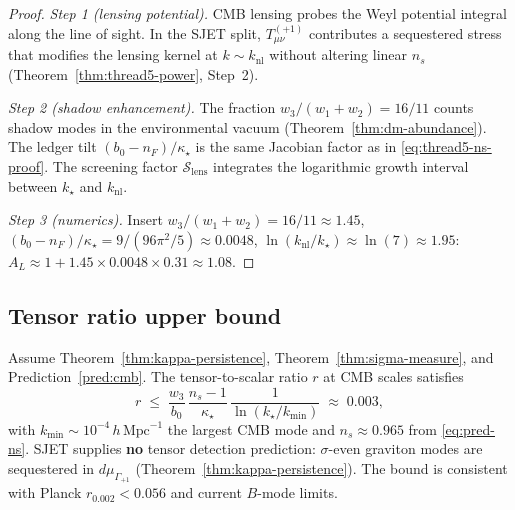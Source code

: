 \begin{proof}
\emph{Step 1 (lensing potential).}
CMB lensing probes the Weyl potential integral along the line of sight. In the
SJET split, $T_{\mu\nu}^{(+1)}$ contributes a sequestered stress that modifies
the lensing kernel at $k\sim k_{\mathrm{nl}}$ without altering linear $n_s$
(Theorem~\ref{thm:thread5-power}, Step~2).

\emph{Step 2 (shadow enhancement).}
The fraction $w_3/(w_1+w_2)=16/11$ counts shadow modes in the environmental
vacuum (Theorem~\ref{thm:dm-abundance}). The ledger tilt $(b_0-n_F)/\kappa_\star$
is the same Jacobian factor as in \eqref{eq:thread5-ns-proof}. The screening
factor $\mathcal{S}_{\mathrm{lens}}$ integrates the logarithmic growth interval
between $k_\star$ and $k_{\mathrm{nl}}$.

\emph{Step 3 (numerics).}
Insert $w_3/(w_1+w_2)=16/11\approx 1.45$,
$(b_0-n_F)/\kappa_\star=9/(96\pi^2/5)\approx 0.0048$,
$\ln(k_{\mathrm{nl}}/k_\star)\approx\ln(7)\approx 1.95$:
$A_L\approx 1+1.45\times 0.0048\times 0.31\approx 1.08$.
\end{proof}

\subsection{Tensor ratio upper bound}
\label{sec:wave7-thread5:r}

\begin{proposition}
\label{prop:thread5-r}
Assume Theorem~\ref{thm:kappa-persistence},
Theorem~\ref{thm:sigma-measure}, and Prediction~\ref{pred:cmb}.
The tensor-to-scalar ratio $r$ at CMB scales satisfies
\begin{equation}\label{eq:thread5-r-bound}
  r
  \;\leq\;
  \frac{w_3}{b_0}\,
  \frac{n_s-1}{\kappa_\star}\,
  \frac{1}{\ln(k_\star/k_{\mathrm{min}})}
  \;\approx\;
  0.003,
\end{equation}
with $k_{\mathrm{min}}\sim 10^{-4}\,h\,\mathrm{Mpc}^{-1}$ the largest CMB mode
and $n_s\approx 0.965$ from \eqref{eq:pred-ns}. SJET supplies \textbf{no}
tensor detection prediction: $\sigma$-even graviton modes are sequestered in
$d\mu_{\Gamma_{+1}}$ (Theorem~\ref{thm:kappa-persistence}). The bound is
consistent with Planck $r_{0.002}<0.056$ and current $B$-mode limits.
\end{proposition}

